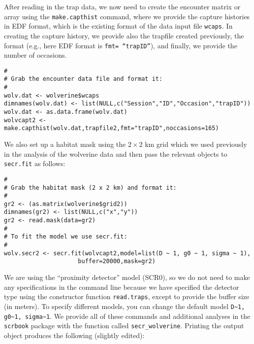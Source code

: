 After reading in the trap data, we now need to create the encounter matrix
or array using the
\mbox{\tt make.capthist} command, where we provide the capture
histories in EDF format, which is the existing format of
the data input file \mbox{\tt wcaps}.
In creating the capture history, we provide also the trapfile created
previously, the format (e.g., here EDF format is \mbox{\tt fmt=
  ``trapID''}), 
and finally, we provide the number of occasions. 
{\small 
\begin{verbatim}
#
# Grab the encounter data file and format it:
#
wolv.dat <- wolverine$wcaps 
dimnames(wolv.dat) <- list(NULL,c("Session","ID","Occasion","trapID"))
wolv.dat <- as.data.frame(wolv.dat)
wolvcapt2 <- make.capthist(wolv.dat,trapfile2,fmt="trapID",noccasions=165)
\end{verbatim}
}
We also set up a
habitat mask using the $2 \times 2$ km grid which we used previously
in the analysis of the wolverine data and then pass the relevant
objects to \mbox{\tt secr.fit} as follows:
{\small
\begin{verbatim}
#
# Grab the habitat mask (2 x 2 km) and format it:
#
gr2 <- (as.matrix(wolverine$grid2))
dimnames(gr2) <- list(NULL,c("x","y"))
gr2 <- read.mask(data=gr2)
#
# To fit the model we use secr.fit:
#
wolv.secr2 <- secr.fit(wolvcapt2,model=list(D ~ 1, g0 ~ 1, sigma ~ 1), 
                     buffer=20000,mask=gr2)
\end{verbatim}
}
We are using the 
 ``proximity detector'' model (SCR0), so we do not need to make any specifications in
the command line because we have specified the detector type using the
constructor function \mbox{\tt read.traps},
except to provide the buffer size (in meters).  To
specify different models, you can change the default model
\verb#D~1, g0~1, sigma~1#.
 We provide all of these commands and
additional analyses in the \mbox{\tt scrbook} package with the
function called \mbox{\tt secr\_wolverine}. Printing the output object
produces the following (slightly edited):

